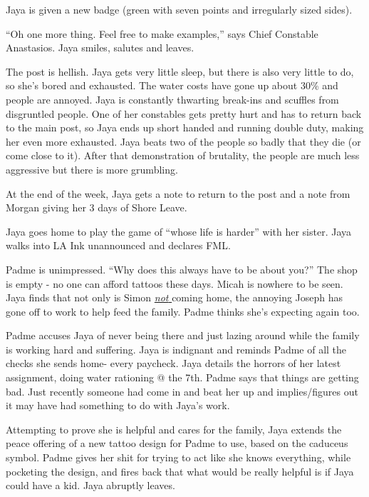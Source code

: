 Jaya is given a new badge (green with seven points and irregularly sized sides).



``Oh one more thing.  Feel free to make examples,''  says Chief Constable Anastasios.  Jaya smiles, salutes and leaves.



The post is hellish.  Jaya gets very little sleep, but there is also very little to do, so she's bored and exhausted.  The water costs have gone up about 30\% and people are annoyed.  Jaya is constantly thwarting break-ins and scuffles from disgruntled people.  One of her constables gets pretty hurt and has to return back to the main post, so Jaya ends up short handed and running double duty, making her even more exhausted.  Jaya beats two of the people so badly that they die (or come close to it).  After that demonstration of brutality, the people are much less aggressive but there is more grumbling.



At the end of the week, Jaya gets a note to return to the post and a note from Morgan giving her 3 days of Shore Leave.




Jaya goes home to play the game of ``whose life is harder'' with her sister.  Jaya walks into LA Ink unannounced and declares FML.



Padme is unimpressed.  ``Why does this always have to be about you?''  The shop is empty - no one can afford tattoos these days.  Micah is nowhere to be seen.  Jaya finds that not only is Simon \underline{ \textit{not } }coming home, the annoying Joseph has gone off to work to help feed the family.  Padme thinks she's expecting again too.



Padme accuses Jaya of never being there and just lazing around while the family is working hard and suffering.  Jaya is indignant and reminds Padme of all the checks she sends home- every paycheck.  Jaya details the horrors of her latest assignment, doing water rationing @ the 7th. Padme says that things are getting bad.  Just recently someone had come in and beat her up and implies/figures out it may have had something to do with Jaya's work. 



Attempting to prove she is helpful and cares for the family, Jaya extends the peace offering of a new tattoo design for Padme to use, based on the caduceus symbol.  Padme gives her shit for trying to act like she knows everything, while pocketing the design, and fires back that what would be really helpful is if Jaya could have a kid.  Jaya abruptly leaves.




